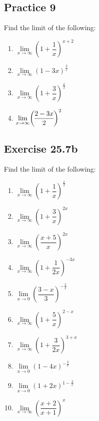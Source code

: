 \documentclass[12pt]{report}
\begin{document}
\subsection{Practice 9}

Find the limit of the following: \setlength{\columnseprule}{1pt}
\setlength{\columnsep}{24pt}
\begin{multicols}{2}
    \begin{enumerate}
        \item $\lim\limits_{x\to\infty}{\left(1+{\dfrac{1}{x}}\right)}^{x+2}$
        \item $\lim\limits_{x\to\infty}{\left(1-3x\right)}^{\frac{2}{x}}$
        \item $\lim\limits_{x\to\infty}{\left(1+\dfrac{3}{x}\right)}^{\frac{x}{2}}$
        \item $\lim\limits_{x\to\infty}\biggl{(\dfrac{2-3x}{2}\biggr)}^{2}$
    \end{enumerate}
\end{multicols}

\subsection{Exercise 25.7b}

Find the limit of the following: \setlength{\columnseprule}{1pt}
\setlength{\columnsep}{24pt}
\begin{multicols}{2}
    \begin{enumerate}
        \item $\lim\limits_{x\to\infty}{\left(1+\dfrac{1}{x}\right)}^{\frac{x}{2}}$
        \item $\lim\limits_{x\to\infty}{\left(1+\dfrac{3}{x}\right)}^{2x}$
        \item $\lim\limits_{x\to\infty}{\left({\dfrac{x+5}{x}}\right)}^{2x}$
        \item $\lim\limits_{x\to\infty}{\left(1+{\dfrac{1}{2x}}\right)}^{-3x}$
        \item $\lim\limits_{x\to0}{\left({\dfrac{3-x}{3}}\right)}^{-{\frac{3}{x}}}$
        \item $\lim\limits_{x\to\infty}{\left(1+{\dfrac{5}{x}}\right)}^{2-x}$
        \item $\lim\limits_{x\to\infty}{\left(1+\dfrac{3}{2x}\right)}^{3+x}$
        \item $\lim\limits_{x\to0}{\left(1-4x\right)}^{-\frac{3}{x}}$
        \item $\lim\limits_{x\to0}{\left(1+2x\right)}^{1-\frac{2}{x}}$
        \item $\lim\limits_{x\to\infty}{\left({\dfrac{x+2}{x+1}}\right)}^{x}$
    \end{enumerate}
\end{multicols}
\end{document}
